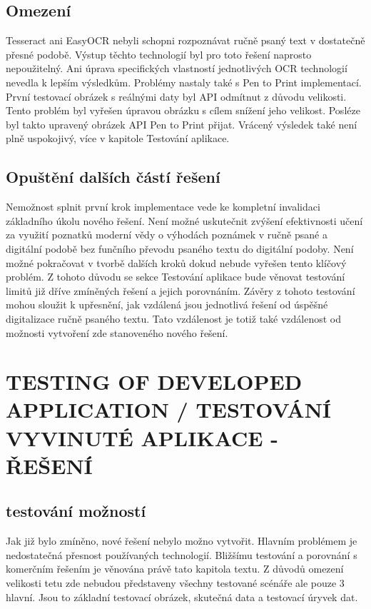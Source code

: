 \documentclass[journal]{IEEEtran}
\begin{document}
\subsection{Omezení}
Tesseract ani EasyOCR nebyli schopni rozpoznávat ručně psaný text v dostatečně přesné podobě.
Výstup těchto technologií byl pro toto řešení naprosto nepoužitelný.
Ani úprava specifických vlastností jednotlivých \ac{OCR} technologií nevedla k lepším výsledkům.
Problémy nastaly také s Pen to Print implementací.
První testovací obrázek s reálnými daty byl \ac{API} odmítnut z důvodu velikosti.
Tento problém byl vyřešen úpravou obrázku s cílem snížení jeho velikost.
Posléze byl takto upravený obrázek \ac{API} Pen to Print přijat.
Vrácený výsledek také není plně uspokojivý, více v kapitole Testování aplikace.

\subsection{Opuštění dalších částí řešení}
Nemožnost splnit první krok implementace vede ke kompletní invalidaci základního úkolu nového řešení.
Není možné uskutečnit zvýšení efektivnosti učení za využití poznatků moderní vědy o výhodách poznámek v ručně psané a digitální podobě bez funčního převodu psaného textu do digitální podoby.
Není možné pokračovat v tvorbě dalších kroků dokud nebude vyřešen tento klíčový problém.
Z tohoto důvodu se  sekce Testování aplikace bude věnovat testování limitů již dříve zmíněných řešení a jejich porovnáním.
Závěry z tohoto testování mohou sloužit k upřesnění, jak vzdálená jsou jednotlivá řešení od úspěšné digitalizace ručně psaného textu.
Tato vzdálenost je totiž také vzdálenost od možnosti vytvoření zde stanoveného nového řešení.


\section{TESTING OF DEVELOPED APPLICATION / TESTOVÁNÍ VYVINUTÉ APLIKACE - ŘEŠENÍ}

\subsection{testování možností}
Jak již bylo zmíněno, nové řešení nebylo možno vytvořit.
Hlavním problémem je nedostatečná přesnost používaných technologií.
Bližšímu testování a porovnání s komerčním řešením je věnována právě tato kapitola textu.
Z důvodů omezení velikosti tetu zde nebudou představeny všechny testované scénáře ale pouze 3 hlavní.
Jsou to základní testovací obrázek, skutečná data a testovací úryvek dat.
\end{document}
